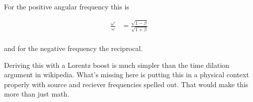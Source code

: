 For the positive angular frequency this is

\begin{align*}
\frac{\omega'}{\omega}
&= \frac{\sqrt{1 - \beta}}{\sqrt{1 + \beta}} 
\\
\end{align*}

and for the negative frequency the reciprocal.

Deriving this with a Lorentz boost is much simpler than the time dilation
argument in wikipedia.  What's missing here is putting this in a physical
context properly with source and reciever frequencies spelled out.
That would make this more than just math.

%
%

%
